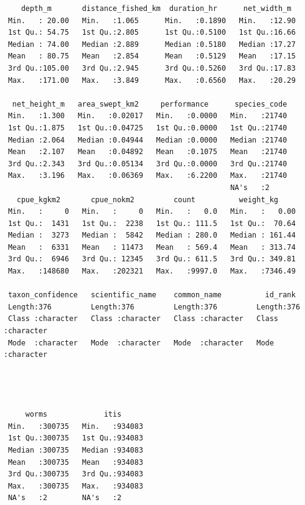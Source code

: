 \documentclass[
  letterpaper,
  oneside,
  open=any]{scrbook}
\begin{document}
\begin{verbatim}
    depth_m       distance_fished_km  duration_hr      net_width_m   
 Min.   : 20.00   Min.   :1.065      Min.   :0.1890   Min.   :12.90  
 1st Qu.: 54.75   1st Qu.:2.805      1st Qu.:0.5100   1st Qu.:16.66  
 Median : 74.00   Median :2.889      Median :0.5180   Median :17.27  
 Mean   : 80.75   Mean   :2.854      Mean   :0.5129   Mean   :17.15  
 3rd Qu.:105.00   3rd Qu.:2.945      3rd Qu.:0.5260   3rd Qu.:17.83  
 Max.   :171.00   Max.   :3.849      Max.   :0.6560   Max.   :20.29  
                                                                     
  net_height_m   area_swept_km2     performance      species_code  
 Min.   :1.300   Min.   :0.02017   Min.   :0.0000   Min.   :21740  
 1st Qu.:1.875   1st Qu.:0.04725   1st Qu.:0.0000   1st Qu.:21740  
 Median :2.064   Median :0.04944   Median :0.0000   Median :21740  
 Mean   :2.107   Mean   :0.04892   Mean   :0.1075   Mean   :21740  
 3rd Qu.:2.343   3rd Qu.:0.05134   3rd Qu.:0.0000   3rd Qu.:21740  
 Max.   :3.196   Max.   :0.06369   Max.   :6.2200   Max.   :21740  
                                                    NA's   :2      
   cpue_kgkm2       cpue_nokm2         count          weight_kg      
 Min.   :     0   Min.   :     0   Min.   :   0.0   Min.   :   0.00  
 1st Qu.:  1431   1st Qu.:  2238   1st Qu.: 111.5   1st Qu.:  70.64  
 Median :  3273   Median :  5842   Median : 280.0   Median : 161.44  
 Mean   :  6331   Mean   : 11473   Mean   : 569.4   Mean   : 313.74  
 3rd Qu.:  6946   3rd Qu.: 12345   3rd Qu.: 611.5   3rd Qu.: 349.81  
 Max.   :148680   Max.   :202321   Max.   :9997.0   Max.   :7346.49  
                                                                     
 taxon_confidence   scientific_name    common_name          id_rank         
 Length:376         Length:376         Length:376         Length:376        
 Class :character   Class :character   Class :character   Class :character  
 Mode  :character   Mode  :character   Mode  :character   Mode  :character  
                                                                            
                                                                            
                                                                            
                                                                            
     worms             itis       
 Min.   :300735   Min.   :934083  
 1st Qu.:300735   1st Qu.:934083  
 Median :300735   Median :934083  
 Mean   :300735   Mean   :934083  
 3rd Qu.:300735   3rd Qu.:934083  
 Max.   :300735   Max.   :934083  
 NA's   :2        NA's   :2       
\end{verbatim}
\end{document}
